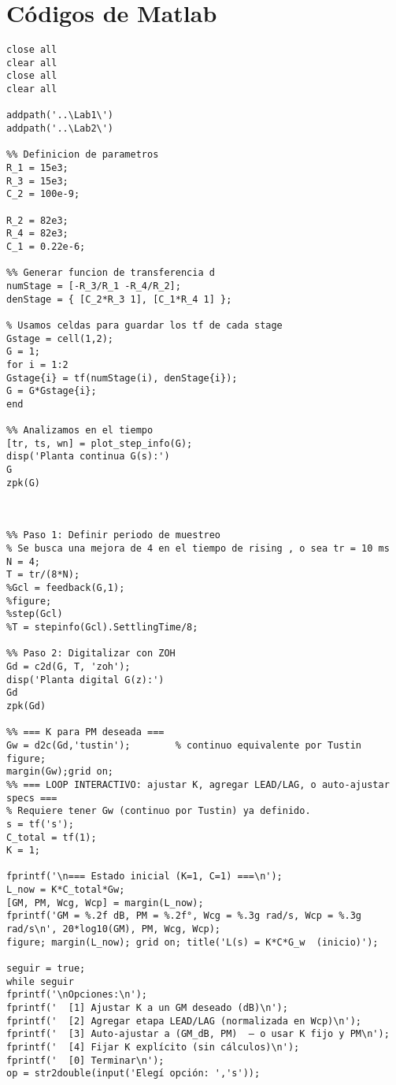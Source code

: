 \onecolumn
\appendices
\section{Códigos de Matlab}

\begin{lstlisting}[style=matlabstyle,caption={Hoja cálculos utilizada para el diseño de los compensadores.},label={matlab:hojaDeCalculos}]
close all
clear all
close all
clear all

addpath('..\Lab1\')
addpath('..\Lab2\')

%% Definicion de parametros
R_1 = 15e3;
R_3 = 15e3;
C_2 = 100e-9;

R_2 = 82e3;
R_4 = 82e3;
C_1 = 0.22e-6;

%% Generar funcion de transferencia d
numStage = [-R_3/R_1 -R_4/R_2];
denStage = { [C_2*R_3 1], [C_1*R_4 1] };

% Usamos celdas para guardar los tf de cada stage
Gstage = cell(1,2);
G = 1;
for i = 1:2
Gstage{i} = tf(numStage(i), denStage{i});
G = G*Gstage{i};
end

%% Analizamos en el tiempo
[tr, ts, wn] = plot_step_info(G);
disp('Planta continua G(s):')
G
zpk(G)



%% Paso 1: Definir periodo de muestreo
% Se busca una mejora de 4 en el tiempo de rising , o sea tr = 10 ms
N = 4; 
T = tr/(8*N);
%Gcl = feedback(G,1);
%figure;
%step(Gcl)
%T = stepinfo(Gcl).SettlingTime/8;

%% Paso 2: Digitalizar con ZOH
Gd = c2d(G, T, 'zoh');
disp('Planta digital G(z):')
Gd
zpk(Gd)

%% === K para PM deseada ===
Gw = d2c(Gd,'tustin');        % continuo equivalente por Tustin
figure;
margin(Gw);grid on;
%% === LOOP INTERACTIVO: ajustar K, agregar LEAD/LAG, o auto-ajustar specs ===
% Requiere tener Gw (continuo por Tustin) ya definido.
s = tf('s');
C_total = tf(1);
K = 1;

fprintf('\n=== Estado inicial (K=1, C=1) ===\n');
L_now = K*C_total*Gw;
[GM, PM, Wcg, Wcp] = margin(L_now);
fprintf('GM = %.2f dB, PM = %.2f°, Wcg = %.3g rad/s, Wcp = %.3g rad/s\n', 20*log10(GM), PM, Wcg, Wcp);
figure; margin(L_now); grid on; title('L(s) = K*C*G_w  (inicio)');

seguir = true;
while seguir
fprintf('\nOpciones:\n');
fprintf('  [1] Ajustar K a un GM deseado (dB)\n');
fprintf('  [2] Agregar etapa LEAD/LAG (normalizada en Wcp)\n');
fprintf('  [3] Auto-ajustar a (GM_dB, PM)  — o usar K fijo y PM\n');
fprintf('  [4] Fijar K explícito (sin cálculos)\n');
fprintf('  [0] Terminar\n');
op = str2double(input('Elegí opción: ','s'));


\end{lstlisting}
